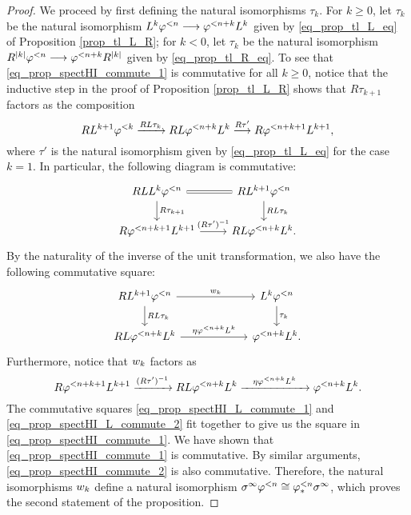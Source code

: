 \begin{proof}
We proceed by first defining the natural isomorphisms $\tau_k$.
For $k \geq 0$, let $\tau_k$ be the natural isomorphism 
$L^k\varphi^{< n} \longrightarrow \varphi^{< n + k}L^k$ given by 
\eqref{eq_prop_tl_L_eq} of Proposition \ref{prop_tl_L_R};
for $k < 0$, let $\tau_k$ be the natural isomorphism
$R^{|k|}\varphi^{< n} \longrightarrow \varphi^{< n + k} R^{|k|}$ given by 
\eqref{eq_prop_tl_R_eq}. To see that \eqref{eq_prop_spectHI_commute_1} is commutative for
all $k \geq 0$, notice that the inductive step in the proof of 
Proposition \ref{prop_tl_L_R} shows that $R\tau_{k + 1}$ factors
as the composition
\[
RL^{k + 1}\varphi^{< k} \xrightarrow{RL\tau_k}
RL\varphi^{< n + k}L^k \stackrel{R\tau'}{\longrightarrow} 
R\varphi^{< n + k + 1}L^{k + 1},
\]
where $\tau'$ is the natural isomorphism given by
\eqref{eq_prop_tl_L_eq} for the case $k = 1$. In particular,
the following diagram is commutative:
\begin{equation}\label{eq_prop_spectHI_L_commute_1}
\begin{tikzcd}
RLL^k\tlHI{n} \arrow[equals]{r} \arrow{d}{R\tau_{k + 1}} &
RL^{k + 1}\tlHI{n} \arrow{d}{RL\tau_k} \\
R\tlHI{n + k + 1}L^{k + 1} \arrow{r}{(R\tau')^{-1}} &
RL\tlHI{n + k}L^k.
\end{tikzcd}
\end{equation}
By the naturality of the inverse of the unit transformation,
we also have the following commutative square:
\begin{equation}\label{eq_prop_spectHI_L_commute_2}
\begin{tikzcd}[column sep=60pt]
RL^{k + 1}\tlHI{n} \arrow{r}{\deloop_k} \arrow{d}{RL\tau_k} &
L^k\tlHI{n} \arrow{d}{\tau_k} \\
RL\tlHI{n + k}L^k \arrow{r}{\eta\tlHI{n + k}L^k} &
\tlHI{n + k}L^k.
\end{tikzcd}
\end{equation}
Furthermore, notice that $w_k$ factors as 
\[
R\varphi^{< n + k + 1}L^{k + 1} \xrightarrow{(R\tau')^{-1}} RL\varphi^{< n + k} L^k
\xrightarrow{\phantom{aa}\eta\varphi^{< n + k}L^k \phantom{aa}} \varphi^{< n + k}L^k.
\]
The commutative squares \eqref{eq_prop_spectHI_L_commute_1} 
and \eqref{eq_prop_spectHI_L_commute_2} fit together to give us the
square in \eqref{eq_prop_spectHI_commute_1}. We have shown that
\eqref{eq_prop_spectHI_commute_1} is commutative. By similar
arguments, \eqref{eq_prop_spectHI_commute_2} is also
commutative. Therefore, the natural isomorphisms
$w_k$ define a natural isomorphism  $\sigma^\infty \varphi^{< n} \cong 
\varphi^{< n}_{*}\sigma^\infty$, which proves the second statement of the 
proposition. 
\end{proof}


%
